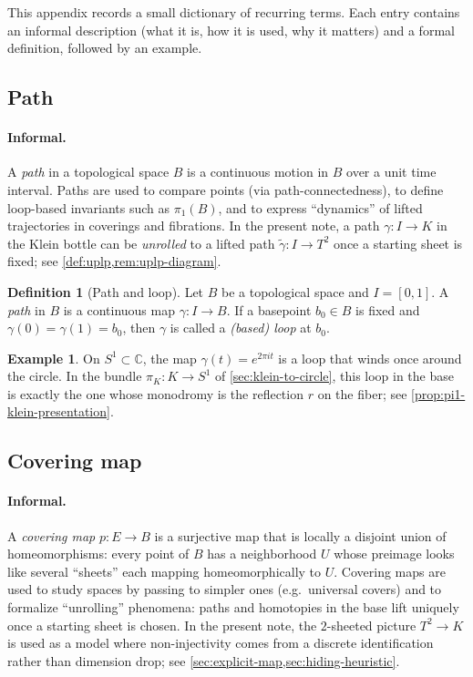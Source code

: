 \documentclass[11pt,a4paper]{article}
\theoremstyle{definition}
\newtheorem{definition}[theorem]{Definition}
\newtheorem{example}[theorem]{Example}
\theoremstyle{remark}
\begin{document}
This appendix records a small dictionary of recurring terms. Each entry contains an informal description (what it is, how it is used, why it matters) and a formal definition, followed by an example.

\subsection{Path}
\label{sec:dict-path}

\paragraph{Informal.}
A \emph{path} in a topological space \(B\) is a continuous motion in \(B\) over a unit time interval. Paths are used to compare points (via path-connectedness), to define loop-based invariants such as \(\pi_1(B)\), and to express ``dynamics'' of lifted trajectories in coverings and fibrations. In the present note, a path \(\gamma:I\to K\) in the Klein bottle can be \emph{unrolled} to a lifted path \(\tilde\gamma:I\to T^2\) once a starting sheet is fixed; see \cref{def:uplp,rem:uplp-diagram}.

\begin{definition}[Path and loop]
\label{def:path}
Let \(B\) be a topological space and \(I=[0,1]\). A \emph{path} in \(B\) is a continuous map \(\gamma:I\to B\). If a basepoint \(b_0\in B\) is fixed and \(\gamma(0)=\gamma(1)=b_0\), then \(\gamma\) is called a \emph{(based) loop} at \(b_0\).
\end{definition}

\begin{example}
\label{ex:path-circle}
On \(S^1\subset \mathbb{C}\), the map \(\gamma(t)=e^{2\pi i t}\) is a loop that winds once around the circle. In the bundle \(\pi_K:K\to S^1\) of \cref{sec:klein-to-circle}, this loop in the base is exactly the one whose monodromy is the reflection \(r\) on the fiber; see \cref{prop:pi1-klein-presentation}.
\end{example}

\subsection{Covering map}
\label{sec:dict-covering}

\paragraph{Informal.}
A \emph{covering map} \(p:E\to B\) is a surjective map that is locally a disjoint union of homeomorphisms: every point of \(B\) has a neighborhood \(U\) whose preimage looks like several ``sheets'' each mapping homeomorphically to \(U\). Covering maps are used to study spaces by passing to simpler ones (e.g.\ universal covers) and to formalize ``unrolling'' phenomena: paths and homotopies in the base lift uniquely once a starting sheet is chosen. In the present note, the \(2\)-sheeted picture \(T^2\to K\) is used as a model where non-injectivity comes from a discrete identification rather than dimension drop; see \cref{sec:explicit-map,sec:hiding-heuristic}.
\end{document}
